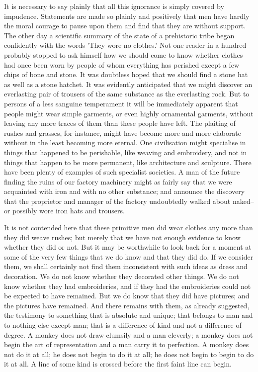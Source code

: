 It is necessary to say plainly that all this ignorance is simply covered by impudence. Statements are made so plainly and positively that men have hardly the moral courage to pause upon them and find that they are without support. The other day a scientific summary of the state of a prehistoric tribe began confidently with the words 'They wore no clothes.' Not one reader in a hundred probably stopped to ask himself how we should come to know whether clothes had once been worn by people of whom everything has perished except a few chips of bone and stone. It was doubtless hoped that we should find a stone hat as well as a stone hatchet. It was evidently anticipated that we might discover an everlasting pair of trousers of the same substance as the everlasting rock. But to persons of a less sanguine temperament it will be immediately apparent that people might wear simple garments, or even highly ornamental garments, without leaving any more traces of them than these people have left. The plaiting of rushes and grasses, for instance, might have become more and more elaborate without in the least becoming more eternal. One civilisation might specialise in things that happened to be perishable, like weaving and embroidery, and not in things that happen to be more permanent, like architecture and sculpture. There have been plenty of examples of such specialist societies. A man of the future finding the ruins of our factory machinery might as fairly say that we were acquainted with iron and with no other substance; and announce the discovery that the proprietor and manager of the factory undoubtedly walked about naked-- or possibly wore iron hats and trousers.

It is not contended here that these primitive men did wear clothes any more than they did weave rushes; but merely that we have not enough evidence to know whether they did or not. But it may be worthwhile to look back for a moment at some of the very few things that we do know and that they did do. If we consider them, we shall certainly not find them inconsistent with such ideas as dress and decoration. We do not know whether they decorated other things. We do not know whether they had embroideries, and if they had the embroideries could not be expected to have remained. But we do know that they did have pictures; and the pictures have remained. And there remains with them, as already suggested, the testimony to something that is absolute and unique; that belongs to man and to nothing else except man; that is a difference of kind and not a difference of degree. A monkey does not draw clumsily and a man cleverly; a monkey does not begin the art of representation and a man carry it to perfection. A monkey does not do it at all; he does not begin to do it at all; he does not begin to begin to do it at all. A line of some kind is crossed before the first faint line can begin.

